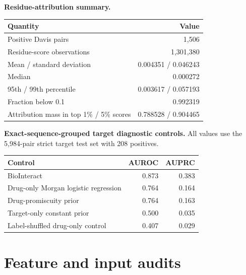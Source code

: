\documentclass[11pt]{article}
\begin{document}
\begin{center}
\small
\textbf{Residue-attribution summary.}\par\smallskip
\begin{tabular}{lr}
\toprule
Quantity & Value \\
\midrule
Positive Davis pairs & 1,506 \\
Residue-score observations & 1,301,380 \\
Mean / standard deviation & 0.004351 / 0.046243 \\
Median & 0.000272 \\
95th / 99th percentile & 0.003617 / 0.057193 \\
Fraction below 0.1 & 0.992319 \\
Attribution mass in top 1\% / 5\% scores & 0.788528 / 0.904465 \\
\bottomrule
\end{tabular}
\end{center}

\begin{center}
\small
\textbf{Exact-sequence-grouped target diagnostic controls.} All values use the 5,984-pair strict target test set with 208 positives.\\[3pt]
\begin{tabular}{lrr}
\toprule
Control & AUROC & AUPRC \\
\midrule
BioInteract & 0.873 & 0.383 \\
Drug-only Morgan logistic regression & 0.764 & 0.164 \\
Drug-promiscuity prior & 0.764 & 0.163 \\
Target-only constant prior & 0.500 & 0.035 \\
Label-shuffled drug-only control & 0.407 & 0.029 \\
\bottomrule
\end{tabular}
\end{center}

\clearpage

\section*{Feature and input audits}
\end{document}
